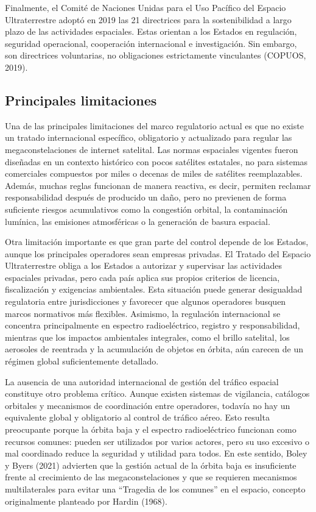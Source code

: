 Finalmente, el Comité de Naciones Unidas para el Uso Pacífico del Espacio Ultraterrestre adoptó en 2019 las 21 directrices para la sostenibilidad a largo plazo de las actividades espaciales. Estas orientan a los Estados en regulación, seguridad operacional, cooperación internacional e investigación. Sin embargo, son directrices voluntarias, no obligaciones estrictamente vinculantes (COPUOS, 2019).

\subsection{Principales limitaciones}

Una de las principales limitaciones del marco regulatorio actual es que no existe un tratado internacional específico, obligatorio y actualizado para regular las megaconstelaciones de internet satelital. Las normas espaciales vigentes fueron diseñadas en un contexto histórico con pocos satélites estatales, no para sistemas comerciales compuestos por miles o decenas de miles de satélites reemplazables. Además, muchas reglas funcionan de manera reactiva, es decir, permiten reclamar responsabilidad después de producido un daño, pero no previenen de forma suficiente riesgos acumulativos como la congestión orbital, la contaminación lumínica, las emisiones atmosféricas o la generación de basura espacial.

Otra limitación importante es que gran parte del control depende de los Estados, aunque los principales operadores sean empresas privadas. El Tratado del Espacio Ultraterrestre obliga a los Estados a autorizar y supervisar las actividades espaciales privadas, pero cada país aplica sus propios criterios de licencia, fiscalización y exigencias ambientales. Esta situación puede generar desigualdad regulatoria entre jurisdicciones y favorecer que algunos operadores busquen marcos normativos más flexibles. Asimismo, la regulación internacional se concentra principalmente en espectro radioeléctrico, registro y responsabilidad, mientras que los impactos ambientales integrales, como el brillo satelital, los aerosoles de reentrada y la acumulación de objetos en órbita, aún carecen de un régimen global suficientemente detallado.

La ausencia de una autoridad internacional de gestión del tráfico espacial constituye otro problema crítico. Aunque existen sistemas de vigilancia, catálogos orbitales y mecanismos de coordinación entre operadores, todavía no hay un equivalente global y obligatorio al control de tráfico aéreo. Esto resulta preocupante porque la órbita baja y el espectro radioeléctrico funcionan como recursos comunes: pueden ser utilizados por varios actores, pero su uso excesivo o mal coordinado reduce la seguridad y utilidad para todos. En este sentido, Boley y Byers (2021) advierten que la gestión actual de la órbita baja es insuficiente frente al crecimiento de las megaconstelaciones y que se requieren mecanismos multilaterales para evitar una “Tragedia de los comunes” en el espacio, concepto originalmente planteado por Hardin (1968). 

